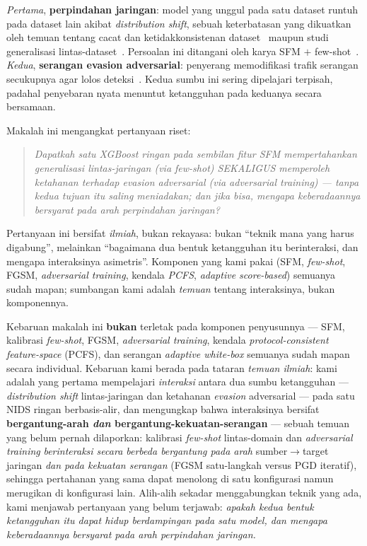 \documentclass[11pt,a4paper]{article}
\begin{document}
\emph{Pertama}, \textbf{perpindahan jaringan}: model yang unggul pada satu dataset
runtuh pada dataset lain akibat \emph{distribution shift}, sebuah keterbatasan yang
dikuatkan oleh temuan tentang cacat dan ketidakkonsistenan
dataset~\cite{engelen,rosay,lanvin,liu,catillo,layeghy} maupun studi generalisasi
lintas-dataset~\cite{dhooge,verkerken,cantone}. Persoalan ini ditangani oleh karya
SFM $+$ few-shot~\cite{martono2024sfm}. \emph{Kedua}, \textbf{serangan evasion
adversarial}: penyerang memodifikasi trafik serangan secukupnya agar lolos
deteksi~\cite{biggio2013,goodfellow2015}. Kedua sumbu ini sering dipelajari
terpisah, padahal penyebaran nyata menuntut ketangguhan pada keduanya secara
bersamaan.

Makalah ini mengangkat pertanyaan riset:
\begin{quote}
\emph{Dapatkah satu XGBoost ringan pada sembilan fitur SFM mempertahankan
generalisasi lintas-jaringan (via few-shot) SEKALIGUS memperoleh ketahanan
terhadap evasion adversarial (via adversarial training) --- tanpa kedua tujuan itu
saling meniadakan; dan jika bisa, mengapa keberadaannya bersyarat pada arah
perpindahan jaringan?}
\end{quote}

\noindent Pertanyaan ini bersifat \emph{ilmiah}, bukan rekayasa: bukan
``teknik mana yang harus digabung'', melainkan ``bagaimana dua bentuk ketangguhan
itu berinteraksi, dan mengapa interaksinya asimetris''. Komponen yang kami pakai
(SFM, \emph{few-shot}, FGSM, \emph{adversarial training}, kendala \emph{PCFS},
\emph{adaptive score-based}) semuanya sudah mapan;
sumbangan kami adalah \emph{temuan} tentang interaksinya, bukan komponennya.

Kebaruan makalah ini \textbf{bukan} terletak pada komponen penyusunnya --- SFM,
kalibrasi \emph{few-shot}, FGSM, \emph{adversarial training}, kendala
\emph{protocol-consistent feature-space} (PCFS), dan serangan \emph{adaptive
white-box} semuanya sudah mapan secara individual. Kebaruan kami berada pada tataran \emph{temuan ilmiah}:
kami adalah yang pertama mempelajari \emph{interaksi} antara dua sumbu ketangguhan
--- \emph{distribution shift} lintas-jaringan dan ketahanan \emph{evasion}
adversarial --- pada satu NIDS ringan berbasis-alir, dan mengungkap bahwa interaksinya
bersifat \textbf{bergantung-arah \emph{dan} bergantung-kekuatan-serangan} ---
sebuah temuan yang belum pernah dilaporkan: kalibrasi \emph{few-shot} lintas-domain
dan \emph{adversarial training} \emph{berinteraksi secara berbeda bergantung pada
arah} sumber$\rightarrow$target jaringan \emph{dan pada kekuatan serangan} (FGSM
satu-langkah versus PGD iteratif), sehingga pertahanan yang sama dapat menolong di
satu konfigurasi namun merugikan di konfigurasi lain. Alih-alih
sekadar menggabungkan teknik yang ada, kami menjawab pertanyaan yang belum terjawab:
\emph{apakah kedua bentuk ketangguhan itu dapat hidup berdampingan pada satu model,
dan mengapa keberadaannya bersyarat pada arah perpindahan jaringan.}
\end{document}
